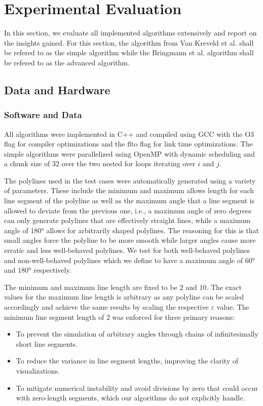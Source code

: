 \section{Experimental Evaluation}
\label{sec:evaluation}

In this section, we evaluate all implemented algorithms extensively and report on the insights gained. For this section, the algorithm from Van Kreveld et al. shall be refered to as the simple algorithm while the Bringmann et al. algorithm shall be refered to as the advanced algorithm. 

\subsection{Data and Hardware}
\label{subsec:hardware}

\subsubsection{Software and Data}
\label{subsubsec:software}

All algorithms were implemented in C++ and compiled using GCC with the O3 flag for compiler optimizations and the flto flag for link time optimizations. The simple algorithms were parallelized using OpenMP with dynamic scheduling and a chunk size of 32 over the two nested for loops iterating over \(i\) and \(j\).

The polylines used in the test cases were automatically generated using a variety of parameters. These include the minimum and maximum allows length for each line segment of the polyline as well as the maximum angle that a line segment is allowed to deviate from the previous one, i.e., a maximum angle of zero degrees can only generate polylines that are effectively straight lines, while a maximum angle of \(180°\) allows for arbitrarily shaped polylines. The reasoning for this is that small angles force the polyline to be more smooth while larger angles cause more erratic and less well-behaved polylines. We test for both well-behaved polylines and non-well-behaved polylines which we define to have a maximum angle of \(60°\) and \(180°\) respectively. 

The minimum and maximum line length are fixed to be \(2\) and \(10\). The exact values for the maximum line length is arbitrary as any polyline can be scaled accordingly and achieve the same results by scaling the respective \(\varepsilon\) value. The minimum line segment length of \(2\) was enforced for three primary reasons: 
\begin{itemize}
	\item To prevent the simulation of arbitrary angles through chains of infinitesimally short line segments.
	\item To reduce the variance in line segment lengths, improving the clarity of visualizations.
	\item To mitigate numerical instability and avoid divisions by zero that could occur with zero-length segments, which our algorithms do not explicitly handle.
\end{itemize}

